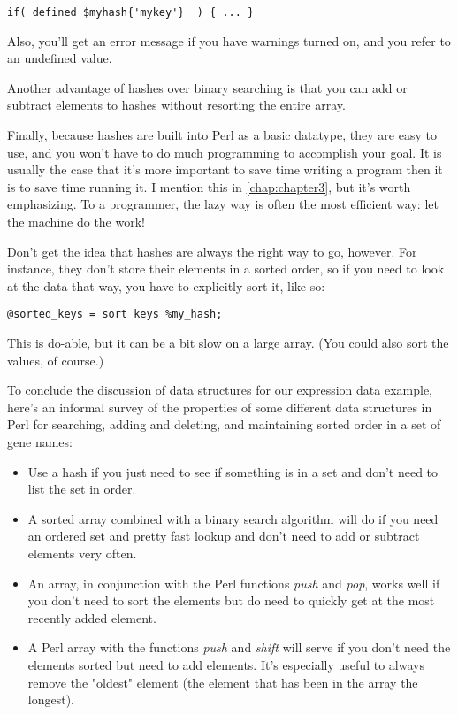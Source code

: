 \begin{lstlisting}
if( defined $myhash{'mykey'}  ) { ... }
\end{lstlisting}

Also, you'll get an error message if you have warnings turned on, and you refer to an undefined value.

Another advantage of hashes over binary searching is that you can add or subtract elements to hashes without resorting the entire array.

Finally, because hashes are built into Perl as a basic datatype, they are easy to use, and you won't have to do much programming to accomplish your goal. It is usually the case that it's more important to save time writing a program then it is to save time running it. I mention this in \autoref{chap:chapter3}, but it's worth emphasizing. To a programmer, the lazy way is often the most efficient way: let the machine do the work!

Don't get the idea that hashes are always the right way to go, however.  For instance, they don't store their elements in a sorted order, so if you need to look at the data that way, you have to explicitly sort it, like so:

\begin{lstlisting}
@sorted_keys = sort keys %my_hash;
\end{lstlisting}

This is do-able, but it can be a bit slow on a large array. (You could also sort the values, of course.)

To conclude the discussion of data structures for our expression data example, here's an informal survey of the properties of some different data structures in Perl for searching, adding and deleting, and maintaining sorted order in a set of gene names: 

\begin{itemize}
  \item Use a hash if you just need to see if something is in a set and don't need to list the set in order.
  \item A sorted array combined with a binary search algorithm will do if you need an ordered set and pretty fast lookup and don't need to add or subtract elements very often.
  \item An array, in conjunction with the Perl functions \textit{push} and \textit{pop}, works well if you don't need to sort the elements but do need to quickly get at the most recently added element.
  \item A Perl array with the functions \textit{push} and \textit{shift} will serve if you don't need the elements sorted but need to add elements. It's especially useful to always remove the "oldest" element (the element that has been in the array the longest).
\end{itemize}

